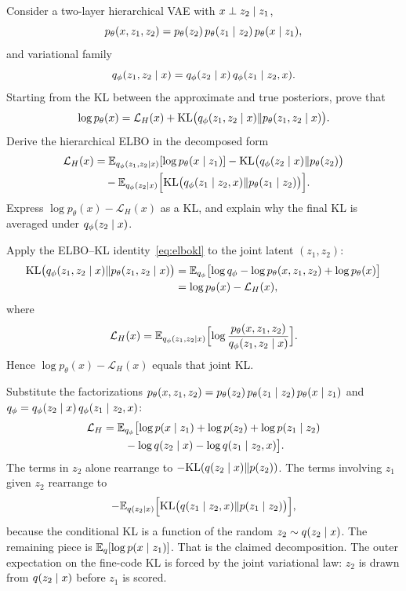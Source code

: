 \begin{hwqbox}
Consider a two-layer hierarchical VAE with $x\perp z_2\mid z_1$,
\[
p_\theta(x,z_1,z_2)=p_\theta(z_2)\,p_\theta(z_1\mid z_2)\,p_\theta(x\mid z_1),
\]
and variational family
\[
q_\phi(z_1,z_2\mid x)=q_\phi(z_2\mid x)\,q_\phi(z_1\mid z_2,x).
\]
Starting from the KL between the approximate and true posteriors, prove that
\[
\log p_\theta(x)
=\mathcal L_H(x)
+\mathrm{KL}\bigl(q_\phi(z_1,z_2\mid x)\Vert p_\theta(z_1,z_2\mid x)\bigr).
\]
Derive the hierarchical ELBO in the decomposed form
\begin{align*}
\mathcal L_H(x)
&=\mathbb{E}_{q_\phi(z_1,z_2\mid x)}[\log p_\theta(x\mid z_1)]
-\mathrm{KL}\bigl(q_\phi(z_2\mid x)\Vert p_\theta(z_2)\bigr)\\
&\quad-\mathbb{E}_{q_\phi(z_2\mid x)}\Bigl[
\mathrm{KL}\bigl(q_\phi(z_1\mid z_2,x)\Vert p_\theta(z_1\mid z_2)\bigr)
\Bigr].
\end{align*}
Express $\log p_\theta(x)-\mathcal L_H(x)$ as a KL, and explain why the final KL is averaged under $q_\phi(z_2\mid x)$.
\end{hwqbox}
\begin{hwsolbox}
Apply the ELBO--KL identity~\eqref{eq:elbokl} to the joint latent $(z_1,z_2)$:
\begin{align*}
\mathrm{KL}\bigl(q_\phi(z_1,z_2\mid x)\Vert p_\theta(z_1,z_2\mid x)\bigr)
&=\mathbb{E}_{q_\phi}\bigl[
\log q_\phi-\log p_\theta(x,z_1,z_2)+\log p_\theta(x)
\bigr]\\
&=\log p_\theta(x)-\mathcal L_H(x),
\end{align*}
where
\[
\mathcal L_H(x)
=\mathbb{E}_{q_\phi(z_1,z_2\mid x)}\Bigl[
\log\frac{p_\theta(x,z_1,z_2)}{q_\phi(z_1,z_2\mid x)}
\Bigr].
\]
Hence $\log p_\theta(x)-\mathcal L_H(x)$ equals that joint KL.

Substitute the factorizations
$p_\theta(x,z_1,z_2)=p_\theta(z_2)\,p_\theta(z_1\mid z_2)\,p_\theta(x\mid z_1)$ and
$q_\phi=q_\phi(z_2\mid x)\,q_\phi(z_1\mid z_2,x)$:
\begin{align*}
\mathcal L_H
&=\mathbb{E}_{q_\phi}\bigl[
\log p(x\mid z_1)+\log p(z_2)+\log p(z_1\mid z_2)\\
&\qquad-\log q(z_2\mid x)-\log q(z_1\mid z_2,x)
\bigr].
\end{align*}
The terms in $z_2$ alone rearrange to $-\mathrm{KL}(q(z_2\mid x)\Vert p(z_2))$.
The terms involving $z_1$ given $z_2$ rearrange to
\[
-\mathbb{E}_{q(z_2\mid x)}\Bigl[
\mathrm{KL}\bigl(q(z_1\mid z_2,x)\Vert p(z_1\mid z_2)\bigr)
\Bigr],
\]
because the conditional KL is a function of the random $z_2\sim q(z_2\mid x)$.
The remaining piece is $\mathbb{E}_{q}[\log p(x\mid z_1)]$. That is the claimed decomposition. The outer expectation on the fine-code KL is forced by the joint variational law: $z_2$ is drawn from $q(z_2\mid x)$ before $z_1$ is scored.
\end{hwsolbox}

